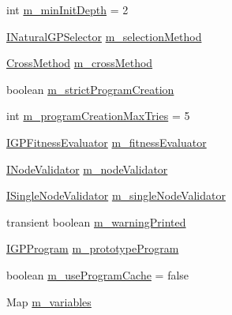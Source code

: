 \begin{DoxyCompactItemize}
\item 
int \hyperlink{classorg_1_1jgap_1_1gp_1_1impl_1_1_g_p_configuration_a2704eaa3eb0e8f1c6ea87195e2e48c79}{m\-\_\-min\-Init\-Depth} = 2
\item 
\hyperlink{interfaceorg_1_1jgap_1_1gp_1_1_i_natural_g_p_selector}{I\-Natural\-G\-P\-Selector} \hyperlink{classorg_1_1jgap_1_1gp_1_1impl_1_1_g_p_configuration_a0db94da3ece7fbce1e078889bc91cef0}{m\-\_\-selection\-Method}
\item 
\hyperlink{classorg_1_1jgap_1_1gp_1_1_cross_method}{Cross\-Method} \hyperlink{classorg_1_1jgap_1_1gp_1_1impl_1_1_g_p_configuration_af3059995753b01212b1ae28d9f7bf1e9}{m\-\_\-cross\-Method}
\item 
boolean \hyperlink{classorg_1_1jgap_1_1gp_1_1impl_1_1_g_p_configuration_ac6b717451d188c9ee860e2bb3c811731}{m\-\_\-strict\-Program\-Creation}
\item 
int \hyperlink{classorg_1_1jgap_1_1gp_1_1impl_1_1_g_p_configuration_abe0c736b193ed2a23e8cc229c0686cf7}{m\-\_\-program\-Creation\-Max\-Tries} = 5
\item 
\hyperlink{interfaceorg_1_1jgap_1_1gp_1_1_i_g_p_fitness_evaluator}{I\-G\-P\-Fitness\-Evaluator} \hyperlink{classorg_1_1jgap_1_1gp_1_1impl_1_1_g_p_configuration_a8dddac3118db00561c4b7ce46a300861}{m\-\_\-fitness\-Evaluator}
\item 
\hyperlink{interfaceorg_1_1jgap_1_1gp_1_1_i_node_validator}{I\-Node\-Validator} \hyperlink{classorg_1_1jgap_1_1gp_1_1impl_1_1_g_p_configuration_a013d8eea3915f50de16e325dd3158295}{m\-\_\-node\-Validator}
\item 
\hyperlink{interfaceorg_1_1jgap_1_1gp_1_1_i_single_node_validator}{I\-Single\-Node\-Validator} \hyperlink{classorg_1_1jgap_1_1gp_1_1impl_1_1_g_p_configuration_a6be223823385d4e27a9b4a511ba4a9a9}{m\-\_\-single\-Node\-Validator}
\item 
transient boolean \hyperlink{classorg_1_1jgap_1_1gp_1_1impl_1_1_g_p_configuration_abe7a7bf74dc8eb2ad649574213d065fd}{m\-\_\-warning\-Printed}
\item 
\hyperlink{interfaceorg_1_1jgap_1_1gp_1_1_i_g_p_program}{I\-G\-P\-Program} \hyperlink{classorg_1_1jgap_1_1gp_1_1impl_1_1_g_p_configuration_afebbac581a837fb7a7d91dd407f1be9c}{m\-\_\-prototype\-Program}
\item 
boolean \hyperlink{classorg_1_1jgap_1_1gp_1_1impl_1_1_g_p_configuration_a8f9f463a64903084b9c05763d5349831}{m\-\_\-use\-Program\-Cache} = false
\item 
Map \hyperlink{classorg_1_1jgap_1_1gp_1_1impl_1_1_g_p_configuration_a952d6bdec1edf71e0ef1aabcb90d5494}{m\-\_\-variables}

\end{DoxyCompactItemize}
